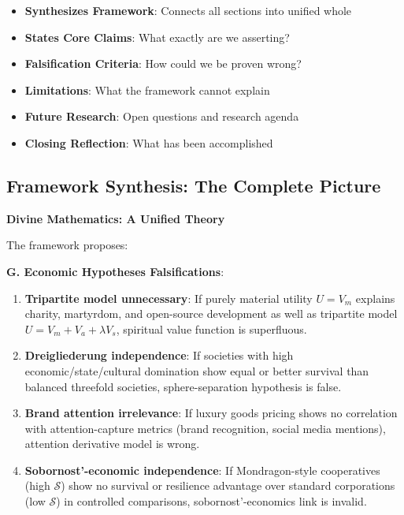 \documentclass[11pt,a4paper]{article}
\theoremstyle{definition}
\theoremstyle{remark}
\begin{document}
\begin{enumerate}
\begin{mdframed}[backgroundcolor=cyan!5,linewidth=2pt]
\begin{itemize}[nosep]
    \item \textbf{Synthesizes Framework}: Connects all sections into unified whole
    \item \textbf{States Core Claims}: What exactly are we asserting?
    \item \textbf{Falsification Criteria}: How could we be proven wrong?
    \item \textbf{Limitations}: What the framework cannot explain
    \item \textbf{Future Research}: Open questions and research agenda
    \item \textbf{Closing Reflection}: What has been accomplished
\end{itemize}
\end{mdframed}

\subsection{Framework Synthesis: The Complete Picture}

\begin{mdframed}[backgroundcolor=blue!5,linewidth=2pt]
\textbf{Divine Mathematics: A Unified Theory}

The framework proposes:


\textbf{G. Economic Hypotheses Falsifications}:
\begin{enumerate}
    \item \textbf{Tripartite model unnecessary}: If purely material utility \(U = V_m\) explains charity, martyrdom, and open-source development as well as tripartite model \(U = V_m + V_a + \lambda V_s\), spiritual value function is superfluous.
    
    \item \textbf{Dreigliederung independence}: If societies with high economic/state/cultural domination show equal or better survival than balanced threefold societies, sphere-separation hypothesis is false.
    
    \item \textbf{Brand attention irrelevance}: If luxury goods pricing shows no correlation with attention-capture metrics (brand recognition, social media mentions), attention derivative model is wrong.
    
    \item \textbf{Sobornost'-economic independence}: If Mondragon-style cooperatives (high \(\mathcal{S}\)) show no survival or resilience advantage over standard corporations (low \(\mathcal{S}\)) in controlled comparisons, sobornost'-economics link is invalid.
    

\end{enumerate}
\end{mdframed}
\end{enumerate}
\end{document}
